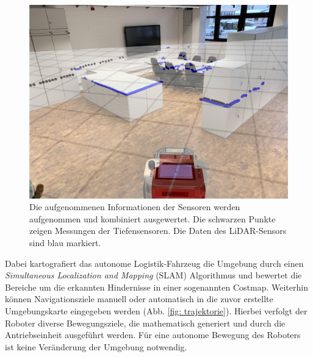 \documentclass[12pt,a4paper,oneside,numbers=noenddot,headsepline,captions=tableheading,toc=bibliography,openany]{article}
\begin{document}
\begin{titlepage}
\begin{figure}[H]
	\includegraphics[width=\columnwidth]{match.pdf}
	\centering
	
	\caption{Die aufgenommenen Informationen der Sensoren werden aufgenommen und kombiniert ausgewertet. Die schwarzen Punkte zeigen Messungen der Tiefensensoren. Die Daten des LiDAR-Sensors sind blau markiert. }
	\label{fig: match}
\end{figure}


 Dabei kartografiert das autonome Logistik-Fahrzeug die Umgebung durch einen \textit{Simultaneous Localization and Mapping} (SLAM) Algorithmus und bewertet die Bereiche um die erkannten Hindernisse in einer sogenannten Costmap. Weiterhin können Navigationsziele manuell oder automatisch in die zuvor erstellte Umgebungskarte eingegeben werden (Abb. \ref{fig: trajektorie}). Hierbei verfolgt der Roboter diverse Bewegungsziele, die mathematisch generiert und durch die Antriebseinheit ausgeführt werden. Für eine autonome Bewegung des Roboters ist keine Veränderung der Umgebung notwendig.\newline
  



\end{titlepage}
\end{document}
